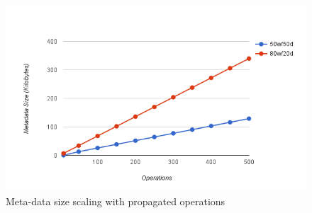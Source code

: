 \begin{figure}[h]
\centering
\includegraphics[scale=0.7]{files/chart3.png}
\caption{Meta-data size scaling with propagated operations}
\label{chart3}
\end{figure}

